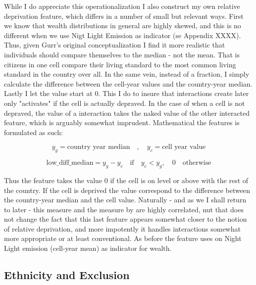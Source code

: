 \documentclass[a4paper]{article}
\begin{document}
While I do appreciate this operationalization I also construct my own relative deprivation feature, which differs in a number of small but relevant ways. First we know that wealth distributions in general are highly skewed, and this is no different when we use Nigt Light Emission as indicator (se Appendix XXXX). Thus, given Gurr's original conceptualization I find it more realistic that individuals should compare themselves to the median - not the mean. That is citizens in one cell compare their living standard to the most common living standard in the country over all. In the same vein, instead of a fraction, I simply calculate the difference between the cell-year values and the country-year median. Lastly I let the value start at 0. This I do to insure that interactions create later only "activates" if the cell is actually depraved. In the case of \cite{Cederman_Gleditsch_Buhaug_2013} when a cell is not depraved, the value of a interaction takes the naked value of the other interacted feature, which is arguably somewhat imprudent. Mathematical the features is formulated as such:\par

$$y_g = \textrm{country year median}\quad ,\quad  y_c = \textrm{cell year value}$$

$$\textrm{low\_diff\_median} = y_g - y_c  \quad \textrm{if} \quad y_c < y_g, \quad 0 \quad \textrm{otherwise}$$

Thus the feature takes the value 0 if the cell is on level or above with the rest of the country. If the cell is deprived the value correspond to the difference between the country-year median and the cell value. Naturally - and as we I shall return to later - this measure and the measure by \cite{Cederman_Weidmann_Gleditsch_2011} are highly correlated, nut that does not change the fact that this last feature appears somewhat closer to the notion of relative deprivation, and more impotently it handles interactions somewhat more appropriate or at least conventional. As before the feature uses on Night Light emission (cell-year mean) as indicator for wealth.\par

\subsection{Ethnicity and Exclusion}


\end{document}
